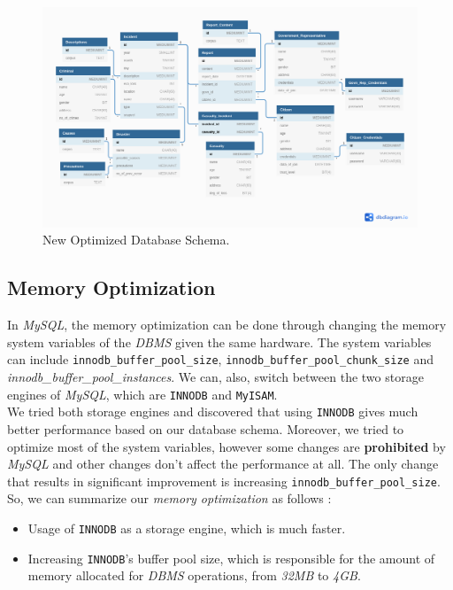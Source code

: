 \begin{figure}[H]
    \centering
    \includegraphics[width=\textwidth]{images/stats/optimized-schema.png}
    \caption{New Optimized Database Schema.}
    \label{fig:db-schema}
\end{figure}

\subsection{Memory Optimization}
In \emph{MySQL}, the memory optimization can be done through changing the memory system variables of the \emph{DBMS} given the same hardware. The system variables can include \texttt{innodb\_buffer\_pool\_size}, \texttt{innodb\_buffer\_pool\_chunk\_size} and \emph{innodb\_buffer\_pool\_instances}. We can, also, switch between the two storage engines of \emph{MySQL}, which are \texttt{INNODB} and \texttt{MyISAM}. \\

We tried both storage engines and discovered that using \texttt{INNODB} gives much better performance based on our database schema. Moreover, we tried to optimize most of the system variables, however some changes are \textbf{prohibited} by \emph{MySQL} and other changes don't affect the performance at all. The only change that results in significant improvement is increasing \texttt{innodb\_buffer\_pool\_size}. \\

So, we can summarize our \emph{memory optimization} as follows :
\begin{itemize}
    \item Usage of \texttt{INNODB} as a storage engine, which is much faster.
    \item Increasing \texttt{INNODB}'s buffer pool size, which is responsible for the amount of memory allocated for \emph{DBMS} operations, from \emph{32MB} to \emph{4GB}.
\end{itemize}


